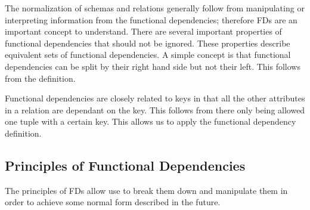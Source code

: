 \documentclass{report}
\begin{document}

        The normalization of schemas and relations generally follow from manipulating or interpreting information from the functional dependencies; therefore FDs are an important concept to understand. There are several important properties of functional dependencies that should not be ignored. These properties describe equivalent sets of functional dependencies. A simple concept is that functional dependencies can be split by their right hand side but not their left. This follows from the definition. 

        \begin{note}
            Functional dependencies are closely related to keys in that all the other attributes in a relation are dependant on the key. This follows from there only being allowed one tuple with a certain key. This allows us to apply the functional dependency definition.
        \end{note}

        \subsection{Principles of Functional Dependencies}
        The principles of FDs allow use to break them down and manipulate them in order to achieve some normal form described in the future.
\vspace{.5cm}
 
           \vspace{.5cm}
         
\end{document}
